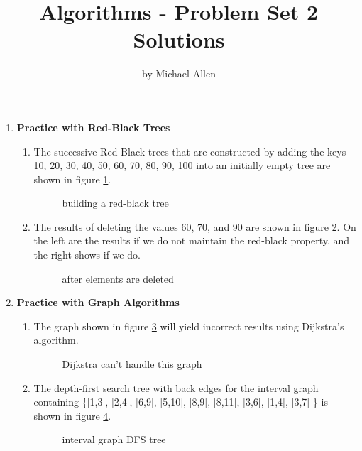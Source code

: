\documentclass{article}
\title{Algorithms - Problem Set 2 Solutions}
\author{by Michael Allen}
\begin{document}
\maketitle

\begin{enumerate}
\item {\bf Practice with Red-Black Trees}

\begin{enumerate}
\item The successive Red-Black trees that are constructed by
adding the keys 10, 20, 30, 40, 50, 60, 70, 80, 90, 100 into an
initially empty tree are shown in figure \ref{2-1a}.

\begin{figure}[htbp]
  \centerline{}
  \caption{building a red-black tree}
  \label{2-1a}
\end{figure}

\item The results of deleting the values 60, 70, and 90 are shown
in figure \ref{2-1b}. On the left are the results if we do not
maintain the red-black property, and the right shows if we do.

\begin{figure}[htbp]
  \centerline{}
  \caption{after elements are deleted}
  \label{2-1b}
\end{figure}
\end{enumerate}

\item {\bf Practice with Graph Algorithms}
\begin{enumerate}
\item The graph shown in figure \ref{2-2a} will yield incorrect
results using Dijkstra's algorithm.

\begin{figure}[htbp]
  \centerline{}
  \caption{Dijkstra can't handle this graph}
  \label{2-2a}
\end{figure}

\item The depth-first search tree  with back edges for the interval graph
containing \{[1,3], [2,4], [6,9], [5,10], [8,9], [8,11], [3,6],
[1,4], [3,7] \} is shown in figure \ref{2-2b}.

\begin{figure}[htbp]
  \centerline{}
  \caption{interval graph DFS tree}
  \label{2-2b}
\end{figure}


\end{enumerate}
\end{enumerate}
\end{document}
